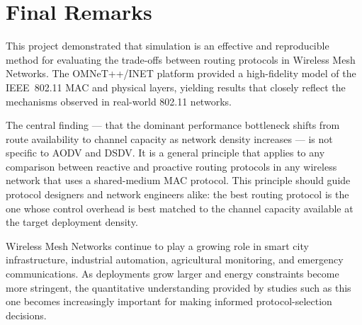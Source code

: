 \section{Final Remarks}

This project demonstrated that simulation is an effective and reproducible method for
evaluating the trade-offs between routing protocols in Wireless Mesh Networks. The
OMNeT++/INET platform provided a high-fidelity model of the IEEE~802.11 MAC and
physical layers, yielding results that closely reflect the mechanisms observed in
real-world 802.11 networks.

The central finding --- that the dominant performance bottleneck shifts from route
availability to channel capacity as network density increases --- is not specific to
AODV and DSDV. It is a general principle that applies to any comparison between reactive
and proactive routing protocols in any wireless network that uses a shared-medium MAC
protocol. This principle should guide protocol designers and network engineers alike:
the best routing protocol is the one whose control overhead is best matched to the
channel capacity available at the target deployment density.

Wireless Mesh Networks continue to play a growing role in smart city infrastructure,
industrial automation, agricultural monitoring, and emergency communications. As
deployments grow larger and energy constraints become more stringent, the quantitative
understanding provided by studies such as this one becomes increasingly important for
making informed protocol-selection decisions.
